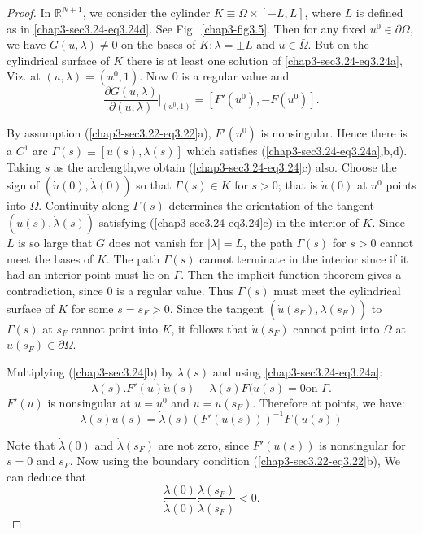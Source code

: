 \begin{proof}
In $\mathbb{R}^{N+1}$, we consider the cylinder $K \equiv \bar{\Omega}
\times [-L, L]$, where $L$ is defined as in
\eqref{chap3-sec3.24-eq3.24d}. See 
Fig.~\ref{chap3-fig3.5}. Then for any fixed $u^0 \in \partial \Omega$, we have
$G(u, \lambda) \neq 0$ on the bases of $K: \lambda = \pm L$ and $u \in
\bar{\Omega}$. But on the cylindrical surface of $K$ there is at least one
solution of \eqref{chap3-sec3.24-eq3.24a}, Viz. at $(u, \lambda ) =
(u^0,1)$. Now 0 is a regular value and  
$$
\frac{\partial
G(u,\lambda)}{\partial(u,\lambda)}|_{(u^0,1)}=[F'(u^0),-F(u^0)]. 
$$  

By assumption (\ref{chap3-sec3.22-eq3.22}a), $F'(u^0)$ is
nonsingular. Hence there is a 
$C^1$ arc $\Gamma (s)\equiv [u(s),\lambda (s)]$ which satisfies
(\ref{chap3-sec3.24-eq3.24a},b,d). 
Taking $s$ as the arclength,\pageoriginale we obtain
(\ref{chap3-sec3.24-eq3.24}c) 
also. Choose the sign of $(\dot{u} (0), \dot{\lambda} (0))$ so that $\Gamma
(s) \in K$ for $s > 0$; that is $\dot{u} (0)$ at $u^0$ points into
$\Omega$. Continuity along $\Gamma (s)$ determines the orientation of
the tangent $(\dot{u}(s),\dot{\lambda} (s))$ satisfying
(\ref{chap3-sec3.24-eq3.24}c) in 
the interior of $K$. Since $L$ is so large that $G$ does not vanish
for $| \lambda| = L$, the path $\Gamma (s)$ for $s > 0$ cannot meet
the bases of $K$. The path $\Gamma (s)$ cannot terminate in the
interior since if it had an interior point must lie on $\Gamma$. Then
the implicit function theorem gives a contradiction, since 0 is a
regular value. Thus $\Gamma(s)$ must meet the cylindrical surface of
$K$ for some $s = s_F > 0$. Since the tangent $(\dot{u}
(s_F),\dot{\lambda} (s_F))$ to $\Gamma(s)$  at $s_F$ cannot point into
$K$, it follows that $\dot{u}(s_F)$ cannot point into $\Omega$ at
$u(s_F) \in \partial \Omega$. 
   
Multiplying (\ref{chap3-sec3.24}b) by $\lambda (s)$ and using
\eqref{chap3-sec3.24-eq3.24a}: 
$$
\lambda (s). F'(u) \dot{u}(s) - \dot{\lambda} (s) F (u(s) = 0 \text{
  on } \Gamma . 
$$
$F'(u)$ is nonsingular at $u = u^0$ and $u = u(s_F)$. Therefore at
points, we have: 
$$
\lambda (s)\dot{u}(s) = \dot{\lambda}(s) (F'(u(s)))^{-1} F(u(s)) 
$$

Note that $\dot{\lambda} (0)$ and $\dot{\lambda} (s_F)$ are not zero,
since $F'(u(s))$ is nonsingular for $s = 0$ and $s_F$. Now using the
boundary condition (\ref{chap3-sec3.22-eq3.22}b), We can deduce that 
\begin{equation*}
\frac{\lambda (0)}{\dot{\lambda} (0)} \frac{\lambda
  (s_F)}{\dot{\lambda}(s_F)} < 0. \tag{3.25}\label{chap3-sec3.24-eq3.25}  
\end{equation*}


\end{proof}
